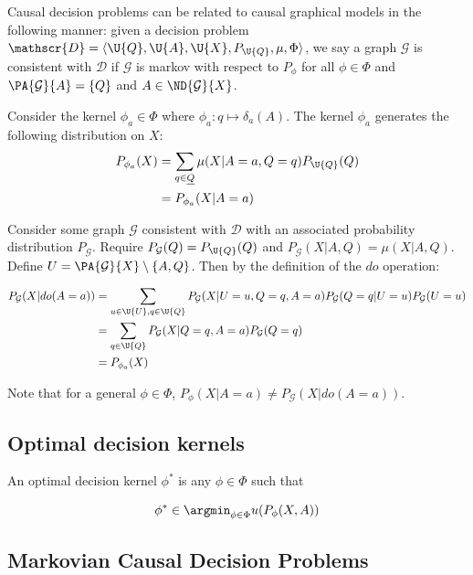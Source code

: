 Causal decision problems can be related to causal graphical models in the following manner: given a decision problem $\mathscr{D}=\langle \U{Q},\U{A},\U{X}, P_{\U{Q}}, \mu, \Phi \rangle$, we say a graph $\mathcal{G}$ is consistent with $\mathscr{D}$ if $\mathcal{G}$ is markov with respect to $P_\phi$ for all $\phi\in\Phi$ and $\PA{\mathcal{G}}{A}=\{Q\}$ and $A\in\ND{\mathcal{G}}{X}$. 

Consider the kernel $\phi_a\in \Phi$ where $\phi_a:q\mapsto \delta_a(A)$. The kernel $\phi_a$ generates the following distribution on $X$:
\begin{align}
    P_{\phi_a}(X)&= \sum_{q\in\underline{Q}} \mu(X|A=a,Q=q) P_{\U{Q}}(Q)\\
                 &= P_{\phi_a}(X|A=a)
\end{align}

Consider some graph $\mathcal{G}$ consistent with $\mathscr{D}$ with an associated probability distribution $P_{\mathcal{G}}$. Require $P_{\mathcal{G}}(Q)=P_{\U{Q}}(Q)$ and $P_{\mathcal{G}}(X|A,Q)=\mu(X|A,Q)$. Define $U=\PA{\mathcal{G}}{X}\setminus\{A,Q\}$. Then by the definition of the $do$ operation:

\begin{align}
    P_{\mathcal{G}}(X|do(A=a)) &= \sum_{u\in\U{U},q\in\U{Q}} P_{\mathcal{G}}(X|U=u,Q=q,A=a) P_{\mathcal{G}}(Q=q|U=u) P_{\mathcal{G}}(U=u)\\
                               &= \sum_{q\in \U{Q}} P_{\mathcal{G}}(X|Q=q,A=a) P_{\mathcal{G}}(Q=q)\\
                               &= P_{\phi_a}(X)
\end{align}

Note that for a general $\phi\in\Phi$, $P_{\phi}(X|A=a)\neq P_{\mathcal{G}}(X|do(A=a))$.

\subsection{Optimal decision kernels}

An optimal decision kernel $\phi^*$ is any $\phi\in \Phi$ such that

\begin{align}
    \phi^* \in \argmin_{\phi\in \Phi} u(P_{\phi}(X,A))
\end{align}


\subsection{Markovian Causal Decision Problems}

